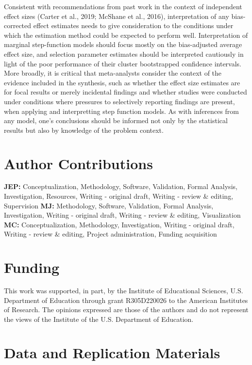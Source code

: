 \documentclass[
  man, donotrepeattitle,floatsintext]{apa7}
\begin{document}
Consistent with recommendations from past work in the context of independent effect sizes (Carter et al., 2019; McShane et al., 2016), interpretation of any bias-corrected effect estimates needs to give consideration to the conditions under which the estimation method could be expected to perform well.
Interpretation of marginal step-function models should focus mostly on the bias-adjusted average effect size, and selection parameter estimates should be interpreted cautiously in light of the poor performance of their cluster bootstrapped confidence intervals.
More broadly, it is critical that meta-analysts consider the context of the evidence included in the synthesis, such as whether the effect size estimates are for focal results or merely incidental findings and whether studies were conducted under conditions where pressures to selectively reporting findings are present, when applying and interpretting step function models.
As with inferences from any model, one's conclusions should be informed not only by the statistical results but also by knowledge of the problem context.

\section*{Author Contributions}\label{author-contributions}

\textbf{JEP:} Conceptualization, Methodology, Software, Validation, Formal Analysis, Investigation, Resources, Writing - original draft, Writing - review \& editing, Supervision \textbf{MJ:} Methodology, Software, Validation, Formal Analysis, Investigation, Writing - original draft, Writing - review \& editing, Visualization \textbf{MC:} Conceptualization, Methodology, Investigation, Writing - original draft, Writing - review \& editing, Project administration, Funding acquisition

\section*{Funding}\label{funding}

This work was supported, in part, by the Institute of Educational Sciences, U.S. Department of Education through grant R305D220026 to the American Institutes of Research.
The opinions expressed are those of the authors and do not represent the views of the Institute of the U.S. Department of Education.

\section*{Data and Replication Materials}\label{data-and-replication-materials}
\end{document}
